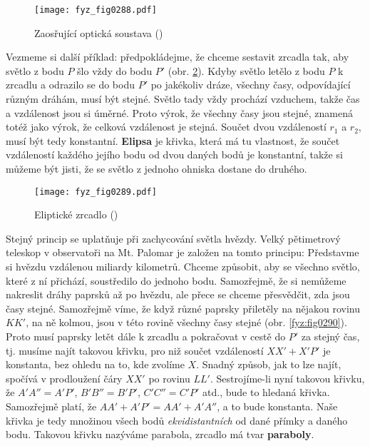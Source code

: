     \begin{figure}[ht!] %
      \centering
      \texttt{[image: fyz\_fig0288.pdf]}
      \caption{Zaosřující optická soustava
               (\cite[s.~351]{Feynman01})}
      \label{fyz:fig0288}
    \end{figure}

    Vezmeme si další příklad: předpokládejme, že chceme sestavit zrcadla tak, aby světlo z bodu 
    \(P\) šlo vždy do bodu \(P'\) (obr. \ref{fyz:fig0289}). Kdyby světlo letělo z bodu \(P\) k 
    zrcadlu a odrazilo se do bodu \(P'\) po jakékoliv dráze, všechny časy, odpovídající různým 
    dráhám, musí být stejné. Světlo tady vždy prochází vzduchem, takže čas a vzdálenost jsou si 
    úměrné. Proto výrok, že všechny časy jsou stejné, znamená totéž jako výrok, že celková 
    vzdálenost je stejná. Součet dvou vzdáleností \(r_1\) a \(r_2\), musí být tedy konstantní. 
    \textbf{Elipsa} je křivka, která má tu vlastnost, že součet vzdáleností každého jejího bodu od 
    dvou daných bodů je konstantní, takže si můžeme být jisti, že se světlo z jednoho ohniska 
    dostane do druhého.
    
    \begin{figure}[ht!] %
      \centering
      \texttt{[image: fyz\_fig0289.pdf]}
      \caption{Eliptické zrcadlo
               (\cite[s.~351]{Feynman01})}
      \label{fyz:fig0289}
    \end{figure}

    Stejný princip se uplatňuje při zachycování světla hvězdy. Velký pětimetrový teleskop v
    observatoři na Mt. Palomar je založen na tomto principu: Představme si hvězdu vzdálenou miliardy
    kilometrů. Chceme způsobit, aby se všechno světlo, které z ní přichází, soustředilo do jednoho
    bodu. Samozřejmě, že si nemůžeme nakreslit dráhy paprsků až po hvězdu, ale přece se chceme
    přesvědčit, zda jsou časy stejné. Samozřejmě víme, že když různé paprsky přiletěly na nějakou
    rovinu \(KK'\), na ně kolmou, jsou v této rovině všechny časy stejné (obr. \ref{fyz:fig0290}).
    Proto musí paprsky letět dále k zrcadlu a pokračovat v cestě do \(P'\) za stejný čas, tj. musíme
    najít takovou křivku, pro niž součet vzdáleností \(XX' + X'P'\) je konstanta, bez ohledu na to,
    kde zvolíme \(X\). Snadný způsob, jak to lze najít, spočívá v prodloužení čáry \(XX'\) po rovinu
    \(LL'\). Sestrojíme-li nyní takovou křivku, že \(A'A'' = A'P'\), \(B'B'' = B'P'\), \(C'C'' =
    C'P'\) atd., bude to hledaná křivka. Samozřejmě platí, že \(AA' + A'P' = AA' + A'A''\), a to
    bude konstanta. Naše křivka je tedy množinou všech bodů \emph{ekvidistantních} od dané přímky a
    daného bodu. Takovou křivku nazýváme parabola, zrcadlo má tvar \textbf{paraboly}.

